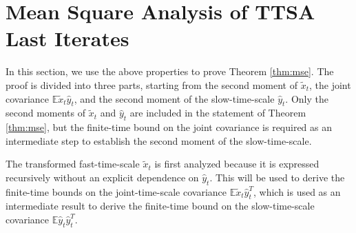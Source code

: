 \section{Mean Square Analysis of TTSA Last Iterates}
In this section, we use the above properties to prove Theorem \ref{thm:mse}. 
The proof is divided into three parts, starting from the second moment of $\tilde{x}_t$, the joint covariance $\mathbb{E}\tilde{x}_t \hat{y}_t$, and the second moment of the slow-time-scale $\hat{y}_t$.
Only the second moments of $\tilde{x}_t$ and $\hat{y}_t$ are included in the statement of Theorem \ref{thm:mse}, but the finite-time bound on the joint covariance is required as an intermediate step to establish the second moment of the slow-time-scale.


The transformed fast-time-scale $\tilde{x}_t$ is first analyzed because it is expressed recursively without an explicit dependence on $\hat{y}_t$. 
This will be used to derive the finite-time bounds on the joint-time-scale covariance $\mathbb{E}\tilde{x}_t \hat{y}_t^T$, which is used as an intermediate result to derive the finite-time bound on the slow-time-scale covariance $\mathbb{E}\hat{y}_t \hat{y}_t^T$. 




